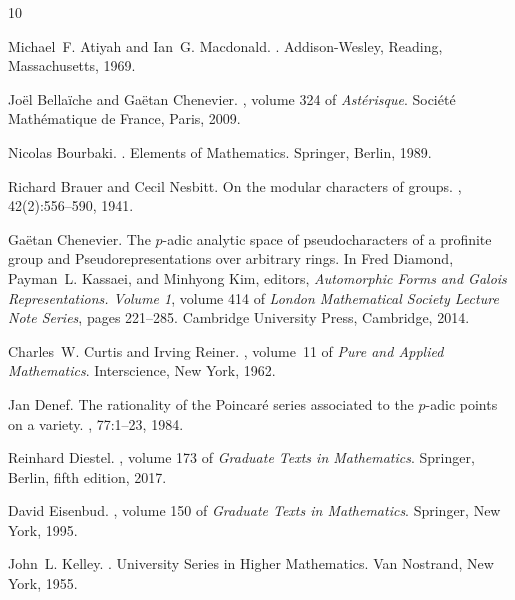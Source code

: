\begin{thebibliography}{10}

Michael~F. Atiyah and Ian~G. Macdonald.
.
\newblock Addison-Wesley, Reading, Massachusetts, 1969.

Jo{\"e}l Bella{\"i}che and Ga{\"e}tan Chenevier.
,
  volume 324 of {\em Ast{\'e}risque}.
\newblock Soci{\'e}t{\'e} Math{\'e}matique de France, Paris, 2009.

Nicolas Bourbaki.
.
\newblock Elements of Mathematics. Springer, Berlin, 1989.

Richard Brauer and Cecil Nesbitt.
\newblock On the modular characters of groups.
, 42(2):556--590, 1941.

Ga{\"e}tan Chenevier.
\newblock The {$p$}-adic analytic space of pseudocharacters of a profinite
  group and {Pseudorepresentations} over arbitrary rings.
\newblock In Fred Diamond, Payman~L. Kassaei, and Minhyong Kim, editors, {\em
  Automorphic Forms and Galois Representations. Volume 1}, volume 414 of {\em
  London Mathematical Society Lecture Note Series}, pages 221--285. Cambridge
  University Press, Cambridge, 2014.

Charles~W. Curtis and Irving Reiner.
, volume~11 of {\em Pure and Applied Mathematics}.
\newblock Interscience, New York, 1962.

Jan Denef.
\newblock The rationality of the {Poincar{\'e}} series associated to the
  {$p$}-adic points on a variety.
, 77:1--23, 1984.

Reinhard Diestel.
, volume 173 of {\em Graduate Texts in
  Mathematics}.
\newblock Springer, Berlin, fifth edition, 2017.

David Eisenbud.
,
  volume 150 of {\em Graduate Texts in Mathematics}.
\newblock Springer, New York, 1995.

John~L. Kelley.
.
\newblock University Series in Higher Mathematics. Van Nostrand, New York,
  1955.


\end{thebibliography}
